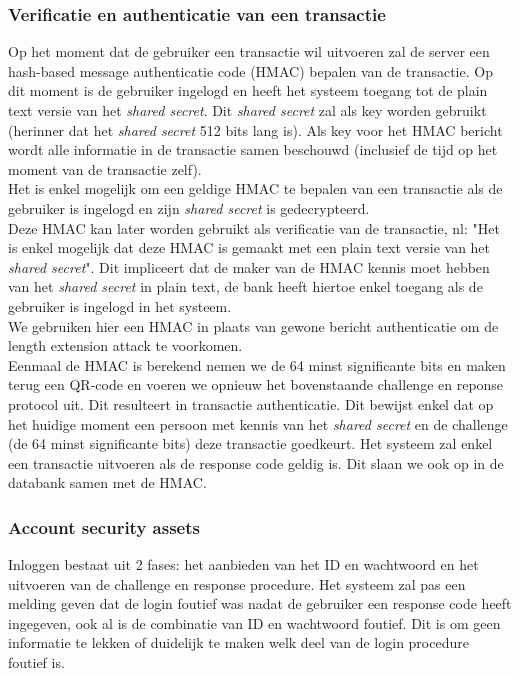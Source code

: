\documentclass[11pt]{article}
\begin{document}
\subsubsection{Verificatie en authenticatie van een transactie}
Op het moment dat de gebruiker een transactie wil uitvoeren zal de server een hash-based message authenticatie code (HMAC) bepalen van de transactie. Op dit moment is de gebruiker ingelogd en heeft het systeem toegang tot de plain text versie van het \emph{shared secret}. Dit \emph{shared secret} zal als key worden gebruikt (herinner dat het \emph{shared secret} 512 bits lang is). Als key voor het HMAC bericht wordt alle informatie in de transactie samen beschouwd (inclusief de tijd op het moment van de transactie zelf). \\

Het is enkel mogelijk om een geldige HMAC te bepalen van een transactie als de gebruiker is ingelogd en zijn \emph{shared secret} is gedecrypteerd.\\

Deze HMAC kan later worden gebruikt als verificatie van de transactie, nl: "Het is enkel mogelijk dat deze HMAC is gemaakt met een plain text versie van het \emph{shared secret}". Dit impliceert dat de maker van de HMAC kennis moet hebben van het \emph{shared secret} in plain text, de bank heeft hiertoe enkel toegang als de gebruiker is ingelogd in het systeem.\\


We gebruiken hier een HMAC in plaats van gewone bericht authenticatie om de length extension attack te voorkomen.\\

Eenmaal de HMAC is berekend nemen we de 64 minst significante bits en maken terug een QR-code en voeren we opnieuw het bovenstaande challenge en reponse protocol uit. Dit resulteert in transactie authenticatie. Dit bewijst enkel dat op het huidige moment een persoon met kennis van het \emph{shared secret} en de challenge (de 64 minst significante bits) deze transactie goedkeurt. Het systeem zal enkel een transactie uitvoeren als de response code geldig is. Dit slaan we ook op in de databank samen met de HMAC.
\subsubsection{Account security assets}
Inloggen bestaat uit 2 fases: het aanbieden van het ID en wachtwoord en het uitvoeren van de challenge en response procedure. Het systeem zal pas een melding geven dat de login foutief was nadat de gebruiker een response code heeft ingegeven, ook al is de combinatie van ID en wachtwoord foutief. Dit is om geen informatie te lekken of duidelijk te maken welk deel van de login procedure foutief is.\\
\end{document}
